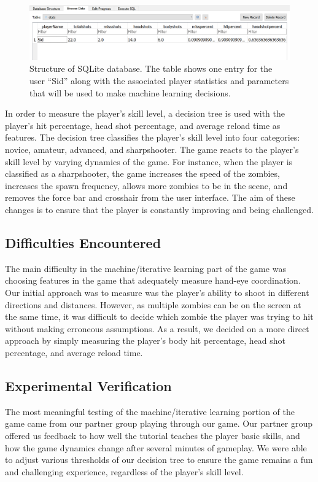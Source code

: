 \documentclass[titlepage, 12pt]{scrartcl}
\begin{document}
    \begin{figure}
        \centering
        \includegraphics[width=\linewidth]{figures/database_structure.PNG}
            \caption{Structure of SQLite database. The table shows one entry for the user “Sid” along with the associated player statistics and parameters that will be used to make machine learning decisions.}
        \label{fig:database_structure}
    \end{figure}
    
    In order to measure the player’s skill level, a decision tree is used with the player’s hit percentage, head shot percentage, and average reload time as features. The decision tree classifies the player’s skill level into four categories: novice, amateur, advanced, and sharpshooter. The game reacts to the player's skill level by varying dynamics of the game. For instance, when the player is classified as a sharpshooter, the game increases the speed of the zombies, increases the spawn frequency, allows more zombies to be in the scene, and removes the force bar and crosshair from the user interface. The aim of these changes is to ensure that the player is constantly improving and being challenged. 
    
    \subsection{Difficulties Encountered}
    The main difficulty in the machine/iterative learning part of the game was choosing features in the game that adequately measure hand-eye coordination. Our initial approach was to measure was the player's ability to shoot in different directions and distances. However, as multiple zombies can be on the screen at the same time, it was difficult to decide which zombie the player was trying to hit without making erroneous assumptions. As a result, we decided on a more direct approach by simply measuring the player's body hit percentage, head shot percentage, and average reload time. 
    
    \subsection{Experimental Verification}
     The most meaningful testing of the machine/iterative learning portion of the game came from our partner group playing through our game. Our partner group offered us feedback to how well the tutorial teaches the player basic skills, and how the game dynamics change after several minutes of gameplay. We were able to adjust various thresholds of our decision tree to ensure the game remains a fun and challenging experience, regardless of the player's skill level. 
     
\end{document}
